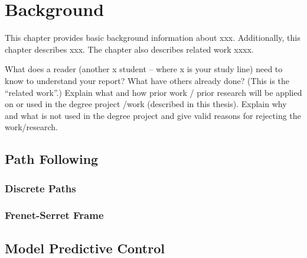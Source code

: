 \documentclass[english]{kththesis}
\begin{document}
\cleardoublepage
\chapter{Background}
\label{ch:background}

This chapter provides basic background information about xxx. Additionally, this chapter describes xxx. The chapter also describes related work xxxx.

What does a reader (another x student -- where x is your study line) need to know to understand your report?
What have others already done? (This is the “related work”.) Explain what and
how prior work / prior research will be applied on or used in the degree
project /work (described in this thesis). Explain why and what is not used in
the degree project and give valid reasons for rejecting the work/research.


\section{Path Following}

\subsection{Discrete Paths}

\subsection{Frenet-Serret Frame}

\section{Model Predictive Control}
\end{document}
